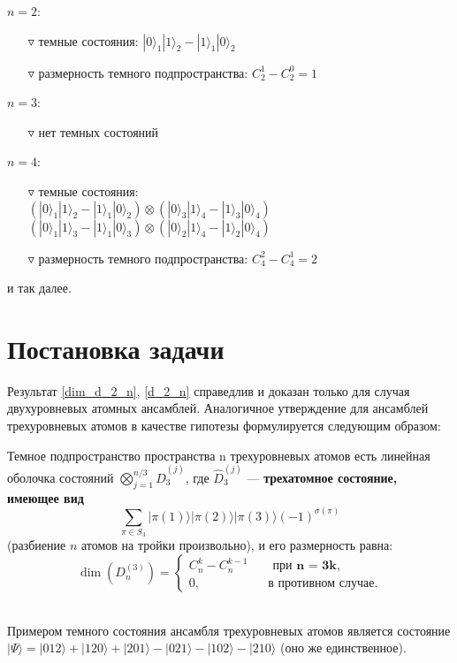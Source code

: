\noindent
$n = 2$:
\begin{itemize}
	\item[$\triangledown$]{темные состояния: $|0\rangle_{1}|1\rangle_{2} - |1\rangle_{1}|0\rangle_{2}$}
	\item[$\triangledown$]{размерность темного подпространства: $C_{2}^{1} - C_{2}^{0} = 1$\\}
\end{itemize}
$n = 3$:
\begin{itemize}
	\item[$\triangledown$]{нет темных состояний\\}
\end{itemize}
$n = 4$:
\begin{itemize}
	\item[$\triangledown$]{темные состояния:\\$(|0\rangle_{1}|1\rangle_{2} - |1\rangle_{1}|0\rangle_{2})\otimes(|0\rangle_{3}|1\rangle_{4} - |1\rangle_{3}|0\rangle_{4})$\\
		$(|0\rangle_{1}|1\rangle_{3} - |1\rangle_{1}|0\rangle_{3})\otimes(|0\rangle_{2}|1\rangle_{4} - |1\rangle_{2}|0\rangle_{4})$}
	\item[$\triangledown$]{размерность темного подпространства: $C_{4}^{2} - C_{4}^{1} = 2$\\}
\end{itemize}
и так далее.

\section{Постановка задачи}\label{sec:ch4/sect2}
Результат \eqref{dim_d_2_n}, \eqref{d_2_n} справедлив и доказан только для случая двухуровневых атомных ансамблей. Аналогичное утверждение для ансамблей трехуровневых
атомов в качестве гипотезы формулируется следующим образом:
\begin{hyp}
	\label{Th:20}Темное подпространство пространства n трехуровневых атомов есть линейная оболочка состояний $\displaystyle \bigotimes_{j=1}^{n/3}{\widehat{D}_{3}^{(j)}}$,
	где $\widehat{D}_{3}^{(j)}$ --- \textbf{трехатомное состояние, имеющее вид}
	\begin{equation}
		\sum_{\pi \in S_{3}}|\pi(1)\rangle|\pi(2)\rangle|\pi(3)\rangle(-1)^{\sigma(\pi)}
	\end{equation}
	(разбиение $n$ атомов на тройки произвольно),
	и его размерность равна:
	\begin{equation}
		\dim(D^{(3)}_{n}) =
		\begin{cases}
			C_{n}^{k} - C_{n}^{k-1} \qquad\textbf{при n = 3k},\\
			0, \qquad~~\quad\qquad\textbf{в противном случае}.
		\end{cases}\label{eq:dim3}
	\end{equation}
\end{hyp}
\
\\
\indent Примером темного состояния ансамбля трехуровневых атомов является состояние
$
|\Psi\rangle = |012\rangle + |120\rangle + |201\rangle - |021\rangle - |102\rangle - |210\rangle$ (оно же единственное).

